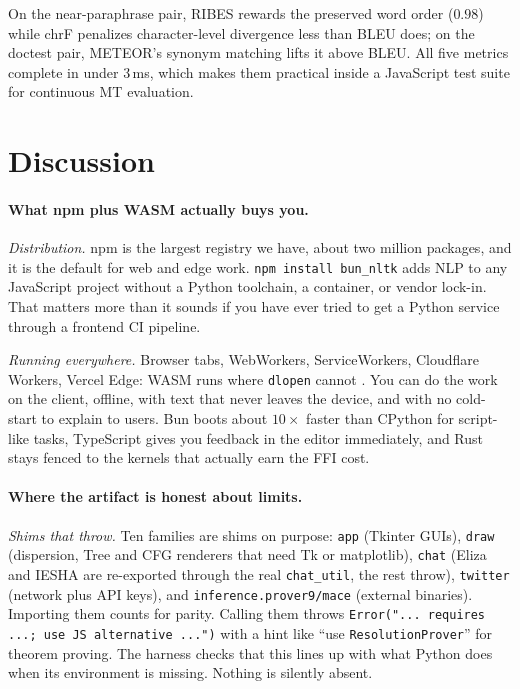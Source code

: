 \documentclass[smallextended]{svjour3}
\begin{document}
On the near-paraphrase pair, RIBES rewards the preserved word order ($0.98$) while chrF penalizes character-level divergence less than BLEU does; on the doctest pair, METEOR's synonym matching lifts it above BLEU. All five metrics complete in under 3\,ms, which makes them practical inside a JavaScript test suite for continuous MT evaluation.

\section{Discussion}
\label{sec:discussion}

\paragraph{What npm plus WASM actually buys you.}

\emph{Distribution.} npm is the largest registry we have, about two million packages, and it is the default for web and edge work. \texttt{npm install bun\_nltk} adds NLP to any JavaScript project without a Python toolchain, a container, or vendor lock-in. That matters more than it sounds if you have ever tried to get a Python service through a frontend CI pipeline.

\emph{Running everywhere.} Browser tabs, WebWorkers, ServiceWorkers, Cloudflare Workers, Vercel Edge: WASM runs where \texttt{dlopen} cannot \cite{cloudflare2024}. You can do the work on the client, offline, with text that never leaves the device, and with no cold-start to explain to users. Bun boots about $10\times$ faster than CPython for script-like tasks, TypeScript gives you feedback in the editor immediately, and Rust stays fenced to the kernels that actually earn the FFI cost.

\paragraph{Where the artifact is honest about limits.}

\emph{Shims that throw.} Ten families are shims on purpose: \texttt{app} (Tkinter GUIs), \texttt{draw} (dispersion, Tree and CFG renderers that need Tk or matplotlib), \texttt{chat} (Eliza and IESHA are re-exported through the real \texttt{chat\_util}, the rest throw), \texttt{twitter} (network plus API keys), and \texttt{inference.prover9/mace} (external binaries). Importing them counts for parity. Calling them throws \texttt{Error("... requires ...; use JS alternative ...")} with a hint like ``use \texttt{ResolutionProver}'' for theorem proving. The harness checks that this lines up with what Python does when its environment is missing. Nothing is silently absent.
\end{document}
